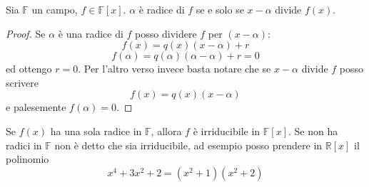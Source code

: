 \begin{teorema}[di Ruffini]
	Sia $\mathbb{F}$ un campo, $f\in\mathbb{F}[x]$. $\alpha$ è radice di $f$ se e solo se $x-\alpha$ divide $f(x)$.
\end{teorema}
\begin{proof}
	Se $\alpha$ è una radice di $f$ posso dividere $f$ per $(x-\alpha)$:
	\begin{equation*}
	f(x)=q(x)(x-\alpha)+r
	\end{equation*}
	\begin{equation*}
	f(\alpha)=q(\alpha)(\alpha-\alpha)+r=0
	\end{equation*}
	ed ottengo $r=0$. Per l'altro verso invece basta notare che se $x-\alpha$ divide $f$ posso scrivere
	\begin{equation*}
	f(x)=q(x)(x-\alpha)
	\end{equation*}
	e palesemente $f(\alpha)=0$.
\end{proof}
\begin{osservazione}
	Se $f(x)$ ha una sola radice in $\mathbb{F}$, allora $f$ è irriducibile in $\mathbb{F}[x]$. Se non ha radici in $\mathbb{F}$ non è detto che sia irriducibile, ad esempio posso prendere in $\mathbb{R}[x]$ il polinomio
	\begin{equation*}
	x^4+3x^2+2=(x^2+1)(x^2+2)
	\end{equation*}
\end{osservazione}





